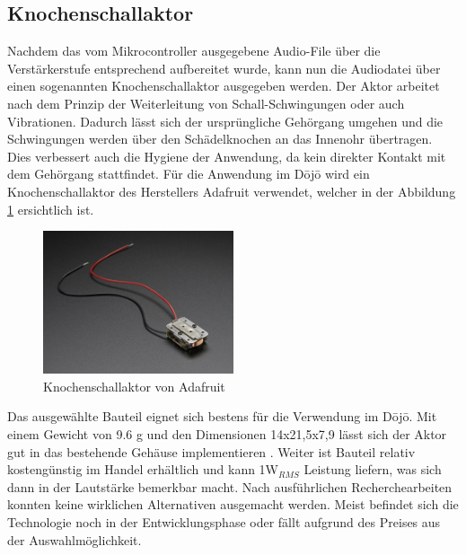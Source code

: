 \subsection{Knochenschallaktor} \label{sec:knochenschallaktor}

Nachdem das vom Mikrocontroller ausgegebene Audio-File über die Verstärkerstufe entsprechend aufbereitet wurde, kann nun die Audiodatei über einen sogenannten Knochenschallaktor ausgegeben werden.
Der Aktor arbeitet nach dem Prinzip der Weiterleitung von Schall-Schwingungen oder auch Vibrationen. Dadurch lässt sich der ursprüngliche Gehörgang umgehen und die Schwingungen werden über den Schädelknochen an das Innenohr übertragen. Dies verbessert auch die Hygiene der Anwendung, da kein direkter Kontakt mit dem Gehörgang stattfindet.\cite{Knochenschall}
Für die Anwendung im Dōjō wird ein Knochenschallaktor des Herstellers Adafruit verwendet, welcher in der Abbildung \ref{fig:knochenschallAda} ersichtlich ist.

\begin{figure}[htbp]
	\centering
	\includegraphics[width=0.5\textwidth]{Data/KnochenschallaktorAdafruit1}
	\caption[Knochenschallaktor \cite{BoneConductorAdafruit}]{Knochenschallaktor von Adafruit}
	\label{fig:knochenschallAda}
\end{figure} 

Das ausgewählte Bauteil eignet sich bestens für die Verwendung im Dōjō. Mit einem Gewicht von 9.6 g und den Dimensionen 14x21,5x7,9 lässt sich der Aktor gut in das bestehende Gehäuse implementieren \cite{BoneConductorAdafruit}. Weiter ist Bauteil relativ kostengünstig im Handel erhältlich und kann 1W$_{RMS}$ Leistung liefern, was sich dann in der Lautstärke bemerkbar macht. Nach ausführlichen Recherchearbeiten konnten keine wirklichen Alternativen ausgemacht werden. Meist befindet sich die Technologie noch in der Entwicklungsphase oder fällt aufgrund des Preises aus der Auswahlmöglichkeit.